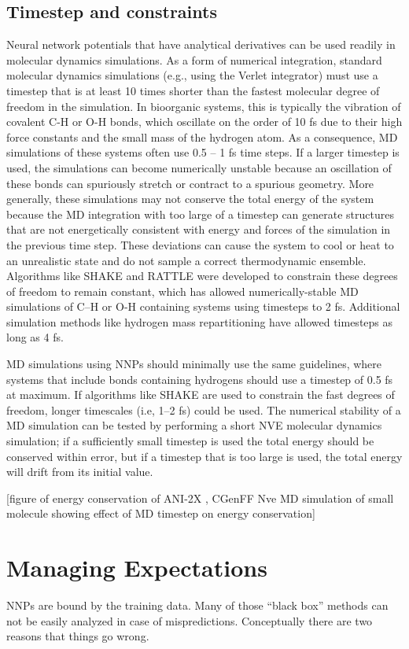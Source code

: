 \documentclass[9pt,bestpractices]{livecoms}
\begin{document}
\subsection{Timestep and constraints}
Neural network potentials that have analytical derivatives can be used readily in molecular dynamics simulations. As a form of numerical integration, standard molecular dynamics simulations (e.g., using the Verlet integrator) must use a timestep that is at least 10 times shorter than the fastest molecular degree of freedom in the simulation. In bioorganic systems, this is typically the vibration of covalent C-H or O-H bonds, which oscillate on the order of 10 fs due to their high force constants and the small mass of the hydrogen atom. As a consequence, MD simulations of these systems often use 0.5 – 1 fs time steps. If a larger timestep is used, the simulations can become numerically unstable because an oscillation of these bonds can spuriously stretch or contract to a spurious geometry. More generally, these simulations may not conserve the total energy of the system because the MD integration with too large of a timestep can generate structures that are not energetically consistent with energy and forces of the simulation in the previous time step. These deviations can cause the system to cool or heat to an unrealistic state and do not sample a correct thermodynamic ensemble. Algorithms like SHAKE and RATTLE were developed to constrain these degrees of freedom to remain constant, which has allowed numerically-stable MD simulations of C–H or O-H containing systems using timesteps to 2 fs. Additional simulation methods like hydrogen mass repartitioning have allowed timesteps as long as 4 fs.
 
MD simulations using NNPs should minimally use the same guidelines, where systems that include bonds containing hydrogens should use a timestep of 0.5 fs at maximum. If algorithms like SHAKE  are used  to constrain the fast degrees of freedom, longer timescales (i.e, 1–2 fs) could be used. The numerical stability of a MD simulation can be tested by performing a short NVE molecular dynamics simulation; if a sufficiently small timestep is used the total energy should be conserved within error, but if a timestep that is too large is used, the total energy will drift from its initial value. 

[figure of energy conservation of ANI-2X , CGenFF Nve MD simulation of small molecule showing effect of MD timestep on energy conservation]

\section{Managing Expectations}
NNPs are bound by the training data. Many of those “black box” methods can not be easily analyzed in case of mispredictions. Conceptually there are two reasons that things go wrong.
\end{document}
